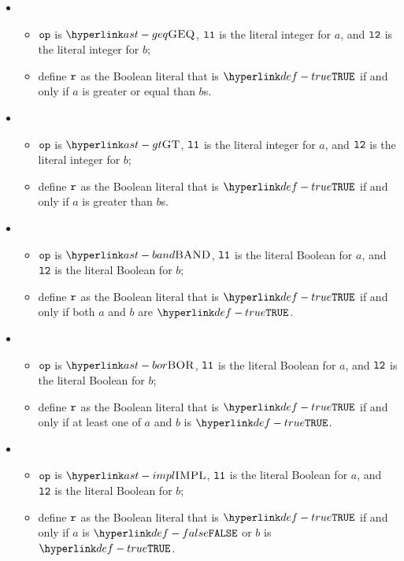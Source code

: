 \begin{itemize}
  \item {}
  \begin{itemize}
    \item $\texttt{op}$ is $\GEQ$, $\texttt{l1}$ is the literal integer for $a$, and $\texttt{l2}$ is the literal integer for $b$;
    \item define $\texttt{r}$ as the Boolean literal that is $\True$ if and only if $a$ is greater or equal than $b$s.
  \end{itemize}

  \item {}
  \begin{itemize}
    \item $\texttt{op}$ is $\GT$, $\texttt{l1}$ is the literal integer for $a$, and $\texttt{l2}$ is the literal integer for $b$;
    \item define $\texttt{r}$ as the Boolean literal that is $\True$ if and only if $a$ is greater than $b$s.
  \end{itemize}

  \item {}
  \begin{itemize}
    \item $\texttt{op}$ is $\BAND$, $\texttt{l1}$ is the literal Boolean for $a$, and $\texttt{l2}$ is the literal Boolean for $b$;
    \item define $\texttt{r}$ as the Boolean literal that is $\True$ if and only if both $a$ and $b$ are $\True$.
  \end{itemize}

  \item {}
  \begin{itemize}
    \item $\texttt{op}$ is $\BOR$, $\texttt{l1}$ is the literal Boolean for $a$, and $\texttt{l2}$ is the literal Boolean for $b$;
    \item define $\texttt{r}$ as the Boolean literal that is $\True$ if and only if at least one of $a$ and $b$ is $\True$.
  \end{itemize}

  \item {}
  \begin{itemize}
    \item $\texttt{op}$ is $\IMPL$, $\texttt{l1}$ is the literal Boolean for $a$, and $\texttt{l2}$ is the literal Boolean for $b$;
    \item define $\texttt{r}$ as the Boolean literal that is $\True$ if and only if $a$ is $\False$ or $b$ is $\True$.
  \end{itemize}


\end{itemize}
